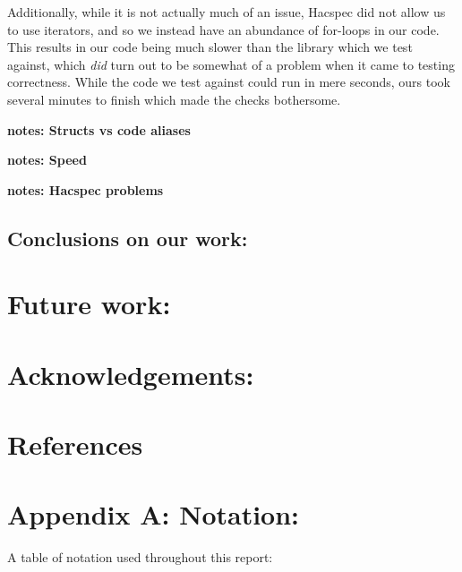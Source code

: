 \documentclass{article}
\begin{document}
Additionally, while it is not actually much of an issue, Hacspec did not allow us to use iterators, and so we instead have an abundance of for-loops in our code. This results in our code being much slower than the library which we test against, which \textit{did} turn out to be somewhat of a problem when it came to testing correctness. While the code we test against could run in mere seconds, ours took several minutes to finish which made the checks bothersome. 

\textbf{notes: Structs vs code aliases}

\textbf{notes: Speed}

\textbf{notes: Hacspec problems}

\subsection{Conclusions on our work:}

\section{Future work:}

\section{Acknowledgements:}


\section{References}
\printbibliography

\section{Appendix A: Notation:} \label{notation}

A table of notation used throughout this report:
\end{document}
